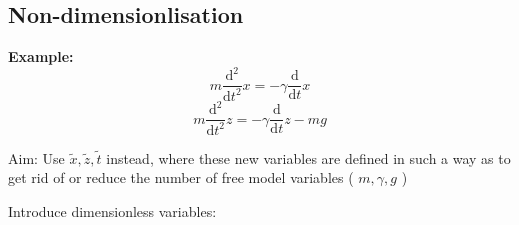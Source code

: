 \documentclass[letterpaper, 11pt]{article}
\begin{document}
\subsection{Non-dimensionlisation}
\label{sec:org00b9d2d}
\textbf{Example:}
\[
m \frac{\mathrm{d}^{2} }{\mathrm{d} t^{2}} x = -\gamma \frac{\mathrm{d} }{\mathrm{d} t} x \]
\[
m \frac{\mathrm{d}^{2} }{\mathrm{d} t^{2}} z = -\gamma \frac{\mathrm{d} }{\mathrm{d} t} z -mg \]

Aim:
Use \(\tilde{x},\tilde{z},\tilde{t}\) instead, where these new variables are defined in such a way as to get rid of or reduce the number of free model variables ( \(m,\gamma,g\) )

Introduce dimensionless variables:
\end{document}
